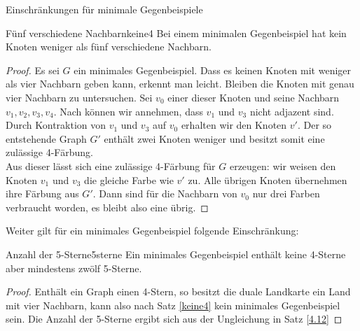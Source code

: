 \begin{section}{Einschränkungen für minimale Gegenbeispiele}
 \begin{satzl}{Fünf verschiedene Nachbarn}{keine4}
  Bei einem minimalen Gegenbeispiel hat kein Knoten weniger als fünf verschiedene Nachbarn.
 \end{satzl}
 \begin{proof}
  Es sei $G$ ein minimales Gegenbeispiel. Dass es keinen Knoten mit weniger als vier Nachbarn geben kann, erkennt man leicht. Bleiben die Knoten mit genau vier Nachbarn zu untersuchen. Sei $v_0$ einer dieser Knoten und seine Nachbarn $v_1,v_2,v_3,v_4$. Nach  können wir annehmen, dass $v_1$ und $v_3$ nicht adjazent sind. Durch Kontraktion von $v_1$ und $v_3$ auf $v_0$ erhalten wir den Knoten $v'$. Der so entstehende Graph $G'$ enthält zwei Knoten weniger und besitzt somit eine zulässige 4-Färbung.\\
  Aus dieser lässt sich eine zulässige 4-Färbung für $G$ erzeugen: wir weisen den Knoten $v_1$ und $v_3$ die gleiche Farbe wie $v'$ zu. Alle übrigen Knoten übernehmen ihre Färbung aus $G'$. Dann sind für die Nachbarn von $v_0$ nur drei Farben verbraucht worden, es bleibt also eine übrig.
 \end{proof}
 
 Weiter gilt für ein minimales Gegenbeispiel folgende Einschränkung:
 
 \begin{satzl}{Anzahl der 5-Sterne}{5sterne}
  Ein minimales Gegenbeispiel enthält keine 4-Sterne aber mindestens zwölf 5-Sterne.
 \end{satzl}
 \begin{proof}
  Enthält ein Graph einen 4-Stern, so besitzt die duale Landkarte ein Land mit vier Nachbarn, kann also nach Satz \ref{keine4} kein minimales Gegenbeispiel sein. Die Anzahl der 5-Sterne ergibt sich aus der Ungleichung in Satz \ref{4.12}
 \end{proof}


\end{section}